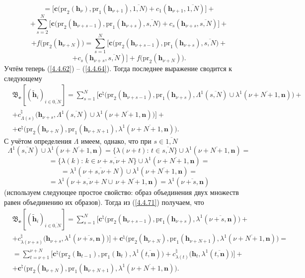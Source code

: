 \documentclass[11pt,twoside]{report}
\newcommand{\ov}{\overline}
\newcommand{\La}{\Lambda}
\newcommand{\la}{\lambda}
\begin{document}
{{$$$$
$$
=\bigl[\mathbf{c}\bigl(\mathrm{pr}_2(\mathbf{h}_\nu),\mathrm{pr}_1(\mathbf{h}_{\nu+1}),
\ov{1,N}\bigl) + c_1(\mathbf{h}_{\nu+1},\ov{1,N})\bigl] +
$$
$$
+ \sum\limits_{s=2}^N\bigl[\mathbf{c}\bigl(\mathrm{pr}_2(\mathbf{h}_{\nu+s-1}),\mathrm{pr}_1
(\mathbf{h}_{\nu+s}),\ov{s,N}\bigl) + c_s(\mathbf{h}_{\nu+s},\ov{s,N})\bigl] +
$$
$$
+f\bigl(\mathrm{pr}_2(\mathbf{h}_{\nu+N})\bigl) =
\sum\limits_{s=1}^N\bigl[\mathbf{c}\bigl(\mathrm{pr}_2(\mathbf{h}_{\nu+s-1}),\mathrm{pr}_1
(\mathbf{h}_{\nu+s}),\ov{s,N}\bigl)+
$$
$$+ c_s(\mathbf{h}_{\nu+s},\ov{s,N})\bigl] + f\bigl(\mathrm{pr}_2(\mathbf{h}_{\nu+N})\bigl).
$$
Учтём теперь (\ref{4.4.62}) -- (\ref{4.4.64}). Тогда последнее выражение сводится к следующему
\begin{eqnarray}
&\mathfrak{B}_\mathbf{e}[(\tilde{\mathbf{h}}_i)_{i\in\ov{0,N}}]=
\sum\limits_{s=1}^N \bigl[\mathbf{c}^\natural\bigl(\mathrm{pr}_2(\mathbf{h}_{\nu+s-1}),
\mathrm{pr}_1(\mathbf{h}_{\nu+s}),
\La^1(\ov{s,N})\cup \la^1(\ov{\nu+N+1,\mathbf{n}})\bigl) +
&\nonumber\\
&+ c_{\La(s)}^\natural\bigl(\mathbf{h}_{\nu+s},\La^1(\ov{s,N}) \cup \la^1(\ov{\nu+N+1,\mathbf{n}})\bigl)\bigl]+
&\nonumber\\
&+ \mathbf{c}^\natural\bigl(\mathrm{pr}_2(\mathbf{h}_{\nu+N}),\mathrm{pr}_1(\mathbf{h}_{\nu+N+1}),
\la^1(\ov{\nu+N+1,\mathbf{n}})\bigl).
&\label{4.4.71}
\end{eqnarray}
С учётом определения $\La$ имеем, однако, что при $s\in\ov{1,N}$
$$\La^1(\ov{s,N}) \cup \la^1(\ov{\nu+N+1,\mathbf{n}}) = \{\la(\nu+t):\,t\in \ov{s,N}\} \cup
\la^1(\ov{\nu+N+1,\mathbf{n}}) =
$$
$$
=\{\la(k):\,k\in\ov{\nu+s,\nu+N}\} \cup \la^1(\ov{\nu+N+1,\mathbf{n}})=
$$
$$
=\la^1(\ov{\nu+s,\nu+N}) \cup \la^1(\ov{\nu+N+1,\mathbf{n}}) =
$$
$$
= \la^1(\ov{\nu+s,\nu+N} \cup\, \ov{\nu+N+1,\mathbf{n}}) = \la^1(\ov{\nu+s,
\mathbf{n}})
$$
(используем следующее простое свойство: образ объединения двух множеств равен
объединению их образов). Тогда из (\ref{4.4.71}) получаем, что
\begin{eqnarray}
&\mathfrak{B}_\mathbf{e}[(\tilde{\mathbf{h}}_i)_{i\in\ov{0,N}}]=
\sum\limits_{s=1}^N \bigl[\mathbf{c}^\natural\bigl(\mathrm{pr}_2(\mathbf{h}_{\nu+s-1}),
\mathrm{pr}_1(\mathbf{h}_{\nu+s}),
\la^1(\ov{\nu+s,\mathbf{n}})\bigl) +
&\nonumber\\
&+c_{\la(\nu+s)}^\natural(\mathbf{h}_{\nu+s},
\la^1(\ov{\nu+s,\mathbf{n}})\bigl)\bigl] +
\mathbf{c}^\natural\bigl(\mathrm{pr}_2(\mathbf{h}_{\nu+N}),\mathrm{pr}_1(\mathbf{h}_{\nu+N+1}),
\la^1(\ov{\nu+N+1,\mathbf{n}})\bigl) =
&\nonumber\\
&=\sum\limits_{t=\nu+1}^{\nu+N}\bigl[\mathbf{c}^\natural\bigl(\mathrm{pr}_2(\mathbf{h}_{t-1}),
\mathrm{pr}_1(\mathbf{h}_t),\la^1(\ov{t,\mathbf{n}})\bigl)+
c_{\la(t)}^\natural\bigl(\mathbf{h}_t,\la^1(\ov{t,\mathbf{n}})\bigl)\bigl] +
&\nonumber\\
&+ \mathbf{c}^\natural\bigl(\mathrm{pr}_2(\mathbf{h}_{\nu+N}),\mathrm{pr}_1(\mathbf{h}_{\nu+N+1}),
\la^1(\ov{\nu+N+1,\mathbf{n}})\bigl).
&\label{4.4.72}
\end{eqnarray}

}}
\end{document}
